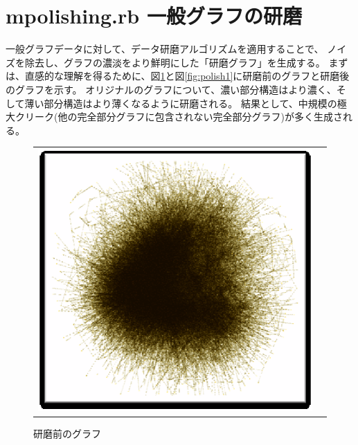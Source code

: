 
\section{mpolishing.rb 一般グラフの研磨\label{sect:mpolishing}}

一般グラフデータに対して、データ研磨アルゴリズムを適用することで、
ノイズを除去し、グラフの濃淡をより鮮明にした「研磨グラフ」を生成する。
まずは、直感的な理解を得るために、図\ref{fig:polish0}と図\ref{fig:polish1}に研磨前のグラフと研磨後のグラフを示す。
オリジナルのグラフについて、濃い部分構造はより濃く、そして薄い部分構造はより薄くなるように研磨される。
結果として、中規模の極大クリーク(他の完全部分グラフに包含されない完全部分グラフ)が多く生成される。

\begin{figure}[htbp]
\begin{center}
\begin{tabular}{cc}

\begin{minipage}{0.3\hsize}
\begin{center}
\includegraphics[scale=0.5]{./polish0.eps}
\caption{研磨前のグラフ\label{fig:polish0}}
\end{center}
\end{minipage}


\end{tabular}
\end{center}
\end{figure}
